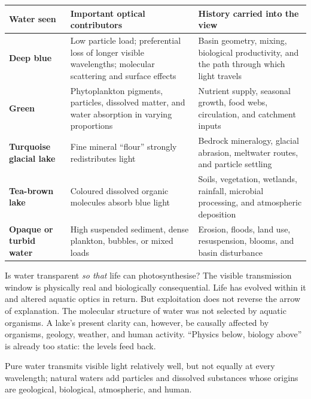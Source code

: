\begin{center}
\small
\renewcommand{\arraystretch}{1.24}
\begin{tabularx}{\linewidth}{>{\bfseries\color{water}}p{.19\linewidth}>{\raggedright\arraybackslash}p{.28\linewidth}X}
\toprule
\textbf{Water seen} & \textbf{Important optical contributors} & \textbf{History carried into the view} \\
\midrule
Deep blue & Low particle load; preferential loss of longer visible wavelengths; molecular scattering and surface effects & Basin geometry, mixing, biological productivity, and the path through which light travels \\
Green & Phytoplankton pigments, particles, dissolved matter, and water absorption in varying proportions & Nutrient supply, seasonal growth, food webs, circulation, and catchment inputs \\
Turquoise glacial lake & Fine mineral ``flour'' strongly redistributes light & Bedrock mineralogy, glacial abrasion, meltwater routes, and particle settling \\
Tea-brown lake & Coloured dissolved organic molecules absorb blue light & Soils, vegetation, wetlands, rainfall, microbial processing, and atmospheric deposition \citep{monteith2007} \\
Opaque or turbid water & High suspended sediment, dense plankton, bubbles, or mixed loads & Erosion, floods, land use, resuspension, blooms, and basin disturbance \\
\bottomrule
\end{tabularx}
\end{center}

Is water transparent \emph{so that} life can photosynthesise? The visible transmission window is physically real and biologically consequential. Life has evolved within it and altered aquatic optics in return. But exploitation does not reverse the arrow of explanation. The molecular structure of water was not selected by aquatic organisms. A lake's present clarity can, however, be causally affected by organisms, geology, weather, and human activity. ``Physics below, biology above'' is already too static: the levels feed back.

\begin{compressed}
Pure water transmits visible light relatively well, but not equally at every wavelength; natural waters add particles and dissolved substances whose origins are geological, biological, atmospheric, and human.
\end{compressed}

